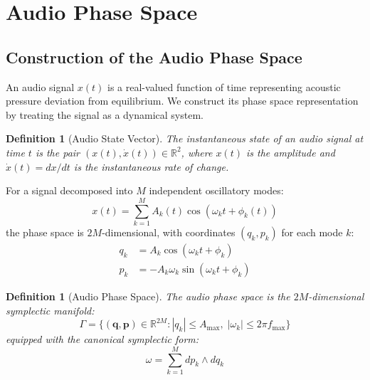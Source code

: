 \documentclass[twocolumn,10pt]{article}
\newtheorem{definition}[theorem]{Definition}
\theoremstyle{remark}
\begin{document}
\section{Audio Phase Space}
\label{sec:phase_space}

\subsection{Construction of the Audio Phase Space}

An audio signal $x(t)$ is a real-valued function of time representing acoustic pressure deviation from equilibrium. We construct its phase space representation by treating the signal as a dynamical system.

\begin{definition}[Audio State Vector]
\label{def:audio_state}
The instantaneous state of an audio signal at time $t$ is the pair $(x(t), \dot{x}(t)) \in \mathbb{R}^2$, where $x(t)$ is the amplitude and $\dot{x}(t) = dx/dt$ is the instantaneous rate of change.
\end{definition}

For a signal decomposed into $M$ independent oscillatory modes:
\begin{equation}
    x(t) = \sum_{k=1}^{M} A_k(t) \cos(\omega_k t + \phi_k(t))
    \label{eq:modal_decomposition}
\end{equation}
the phase space is $2M$-dimensional, with coordinates $(q_k, p_k)$ for each mode $k$:
\begin{align}
    q_k &= A_k \cos(\omega_k t + \phi_k) \label{eq:mode_position} \\
    p_k &= -A_k \omega_k \sin(\omega_k t + \phi_k) \label{eq:mode_momentum}
\end{align}

\begin{definition}[Audio Phase Space]
\label{def:audio_phase_space}
The audio phase space is the $2M$-dimensional symplectic manifold:
\begin{equation}
    \Gamma = \{(\mathbf{q}, \mathbf{p}) \in \mathbb{R}^{2M} : |q_k| \leq A_{\max}, \; |\omega_k| \leq 2\pi f_{\max}\}
\end{equation}
equipped with the canonical symplectic form:
\begin{equation}
    \omega = \sum_{k=1}^{M} dp_k \wedge dq_k
    \label{eq:audio_symplectic}
\end{equation}
\end{definition}
\end{document}
